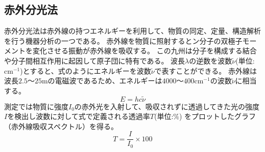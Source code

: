\documentclass[11pt]{jsarticle}
\begin{document}
\subsection{赤外分光法}
赤外分光法は赤外線の持つエネルギーを利用して、物質の同定、定量、構造解析を行う機器分析の一つである。
赤外線を物質に照射するとン分子の双極子モーメントを変化させる振動が赤外線を吸収する。
この九州は分子を構成する結合や分子間相互作用に起因して原子団に特有である。
波長$\lambda$の逆数を波数$\tilde{\nu}$(単位:$\mathrm{cm^{-1}}$)とすると、式のようにエネルギーを波数$\tilde{\nu}$で表すことができる。
赤外線は波長$2.5～25 \mathrm{m}$の電磁波であるため、エネルギーは$4000～400 \mathrm{cm^{-1}}$の波数$\tilde{\nu}$に相当する。
\begin{equation}
    E=hc\tilde{\nu}
\end{equation}
測定では物質に強度$I_0$の赤外光を入射して、吸収されずに透過してきた光の強度$I$を検出し波数に対して式で定義される透過率$T$(単位:$\mathrm{\%}$)
をプロットしたグラフ（赤外線吸収スペクトル）を得る。
\begin{equation}
    T=\frac{I}{I_0} \times 100
\end{equation}
\end{document}
